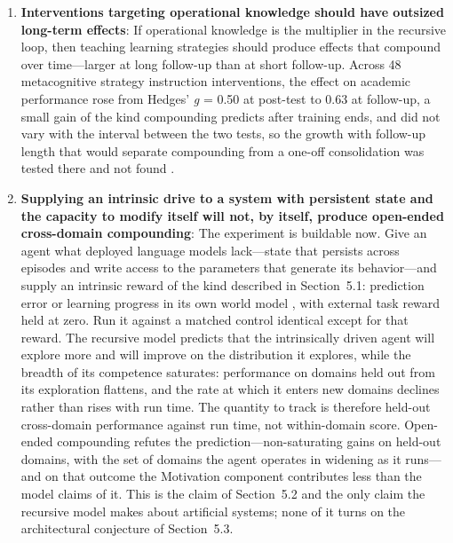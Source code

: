 \documentclass[12pt,a4paper]{article}
\begin{document}
\begin{enumerate}
\item \textbf{Interventions targeting operational knowledge should have outsized long-term effects}: If operational knowledge is the multiplier in the recursive loop, then teaching learning strategies should produce effects that compound over time---\hspace{0pt}larger at long follow-up than at short follow-up. Across 48 metacognitive strategy instruction interventions, the effect on academic performance rose from Hedges' \emph{g} = 0.50 at post-test to 0.63 at follow-up, a small gain of the kind compounding predicts after training ends, and did not vary with the interval between the two tests, so the growth with follow-up length that would separate compounding from a one-off consolidation was tested there and not found \citep{deBoer2018}.

\item \textbf{Supplying an intrinsic drive to a system with persistent state and the capacity to modify itself will not, by itself, produce open-ended cross-domain compounding}: The experiment is buildable now. Give an agent what deployed language models lack---\hspace{0pt}state that persists across episodes and write access to the parameters that generate its behavior---\hspace{0pt}and supply an intrinsic reward of the kind described in Section~5.1: prediction error or learning progress in its own world model \citep{Schmidhuber1991,Oudeyer2007,Pathak2017}, with external task reward held at zero. Run it against a matched control identical except for that reward. The recursive model predicts that the intrinsically driven agent will explore more and will improve on the distribution it explores, while the breadth of its competence saturates: performance on domains held out from its exploration flattens, and the rate at which it enters new domains declines rather than rises with run time. The quantity to track is therefore held-out cross-domain performance against run time, not within-domain score. Open-ended compounding refutes the prediction---\hspace{0pt}non-saturating gains on held-out domains, with the set of domains the agent operates in widening as it runs---\hspace{0pt}and on that outcome the Motivation component contributes less than the model claims of it. This is the claim of Section~5.2 and the only claim the recursive model makes about artificial systems; none of it turns on the architectural conjecture of Section~5.3.


\end{enumerate}
\end{document}

